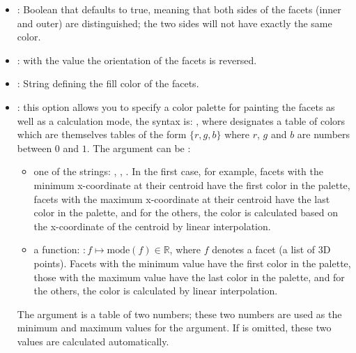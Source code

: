 \begin{itemize}
    \item {}: Boolean that defaults to true, meaning that both sides of the facets (inner and outer) are distinguished; the two sides will not have exactly the same color.
    
    \item {} : with the value \true the orientation of the facets is reversed.
    
    \item {}: String defining the fill color of the facets.
    \item {}:  this option allows you to specify a color palette for painting the facets as well as a calculation mode, the syntax is: , where  designates a table of colors which are themselves tables of the form $\{r,g,b\}$ where $r$, $g$ and $b$ are numbers between $0$ and $1$. The argument  can be :
    \begin{itemize}
        \item one of the strings: , , . In the first case, for example, facets with the minimum x-coordinate at their centroid have the first color in the palette, facets with the maximum x-coordinate at their centroid have the last color in the palette, and for the others, the color is calculated based on the x-coordinate of the centroid by linear interpolation.
        \item a function: $\colon f \mapsto \mathrm{mode}(f)\in\mathbb R$, where $f$ denotes a facet (a list of 3D points). Facets with the minimum value have the first color in the palette, those with the maximum value have the last color in the palette, and for the others, the color is calculated by linear interpolation.
    \end{itemize}
    The  argument is a table of two numbers; these two numbers are used as the minimum and maximum values ​​for the  argument. If  is omitted, these two values ​​are calculated automatically.
\end{itemize}


